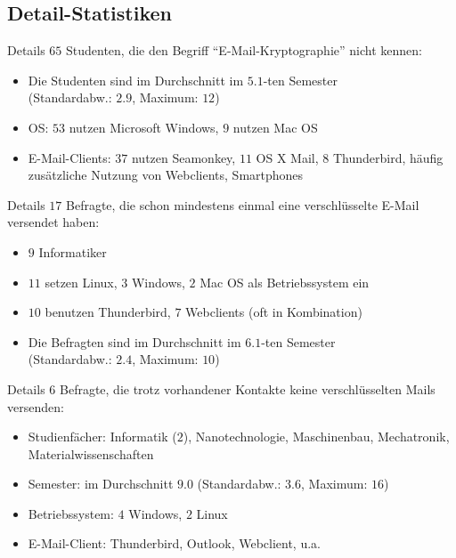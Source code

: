 \documentclass[]{beamer}
\begin{document}
\subsection*{Detail-Statistiken}
\begin{frame}{Details}
	$65$ Studenten, die den Begriff ``E-Mail-Kryptographie'' nicht kennen:
	\begin{itemize}
		\item Die Studenten sind im Durchschnitt im $5.1$-ten Semester\\ (Standardabw.: $2.9$, Maximum: $12$)
		\item OS: $53$ nutzen Microsoft Windows, $9$ nutzen Mac OS
		\item E-Mail-Clients: $37$ nutzen Seamonkey, $11$ OS X Mail, $8$ Thunderbird, häufig zusätzliche Nutzung von Webclients, Smartphones
	\end{itemize}
\end{frame}

\begin{frame}{Details}
	$17$ Befragte, die schon mindestens einmal eine verschlüsselte E-Mail versendet haben:
	\begin{itemize}
		\item $9$ Informatiker
		\item $11$ setzen Linux, $3$ Windows, $2$ Mac OS als Betriebssystem ein
		\item $10$ benutzen Thunderbird, $7$ Webclients (oft in Kombination)
		\item Die Befragten sind im Durchschnitt im $6.1$-ten Semester\\(Standardabw.: $2.4$, Maximum: $10$)
	\end{itemize}
\end{frame}


\begin{frame}{Details}
	$6$ Befragte, die trotz vorhandener Kontakte keine verschlüsselten Mails versenden:
	\begin{itemize}
		\item Studienfächer: Informatik ($2$), Nanotechnologie, Maschinenbau, Mechatronik, Materialwissenschaften
		\item Semester: im Durchschnitt $9.0$ (Standardabw.: $3.6$, Maximum: $16$)
		\item Betriebssystem: $4$ Windows, $2$ Linux
		\item E-Mail-Client: Thunderbird, Outlook, Webclient, u.a.
	\end{itemize}
\end{frame}
\end{document}
